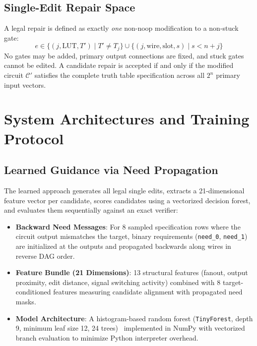 \documentclass[11pt]{article}
\begin{document}
\subsection{Single-Edit Repair Space}
A legal repair is defined as exactly \textit{one} non-noop modification to a non-stuck gate:
\begin{equation}
    e \in \{(j, \text{LUT}, T') \mid T' \ne T_j\} \cup \{(j, \text{wire}, \text{slot}, s) \mid s < n + j\}
\end{equation}
No gates may be added, primary output connections are fixed, and stuck gates cannot be edited. A candidate repair is accepted if and only if the modified circuit $\mathcal{C}'$ satisfies the complete truth table specification across all $2^n$ primary input vectors.

\section{System Architectures and Training Protocol}

\subsection{Learned Guidance via Need Propagation}
The learned approach generates all legal single edits, extracts a 21-dimensional feature vector per candidate, scores candidates using a vectorized decision forest, and evaluates them sequentially against an exact verifier:
\begin{itemize}
    \item \textbf{Backward Need Messages}: For 8 sampled specification rows where the circuit output mismatches the target, binary requirements (\texttt{need\_0}, \texttt{need\_1}) are initialized at the outputs and propagated backwards along wires in reverse DAG order.
    \item \textbf{Feature Bundle (21 Dimensions)}: 13 structural features (fanout, output proximity, edit distance, signal switching activity) combined with 8 target-conditioned features measuring candidate alignment with propagated need masks.
    \item \textbf{Model Architecture}: A histogram-based random forest (\texttt{TinyForest}, depth 9, minimum leaf size 12, 24 trees)~\citep{breiman2001random} implemented in NumPy with vectorized branch evaluation to minimize Python interpreter overhead.
\end{itemize}
\end{document}
